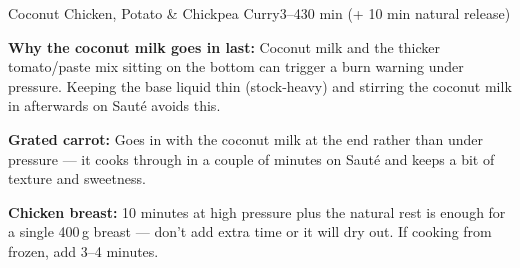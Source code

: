 \begin{recipebox}{Coconut Chicken, Potato \& Chickpea Curry}{3--4}{30 min (+ 10 min natural release)}
\begin{notes}
\textbf{Why the coconut milk goes in last:} Coconut milk and the thicker tomato/paste mix sitting on the bottom can trigger a burn warning under pressure. Keeping the base liquid thin (stock-heavy) and stirring the coconut milk in afterwards on Saut\'{e} avoids this.

\textbf{Grated carrot:} Goes in with the coconut milk at the end rather than under pressure --- it cooks through in a couple of minutes on Saut\'{e} and keeps a bit of texture and sweetness.

\textbf{Chicken breast:} 10 minutes at high pressure plus the natural rest is enough for a single 400\,g breast --- don't add extra time or it will dry out. If cooking from frozen, add 3--4 minutes.
\end{notes}

\end{recipebox}
